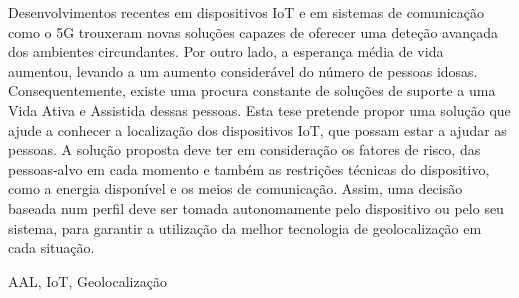 


Desenvolvimentos recentes em dispositivos IoT e em sistemas de comunicação como o 5G trouxeram novas soluções capazes de oferecer uma deteção avançada dos ambientes circundantes. Por outro lado, a esperança média de vida aumentou, levando a um aumento considerável do número de pessoas idosas. Consequentemente, existe uma procura constante de soluções de suporte a uma Vida Ativa e Assistida  dessas pessoas. Esta tese pretende propor uma solução que ajude a conhecer a localização dos dispositivos IoT, que possam estar a ajudar as pessoas. A solução proposta deve ter em consideração os fatores de risco, das pessoas-alvo em cada momento e também as restrições técnicas do dispositivo, como a energia disponível e os meios de comunicação. Assim, uma decisão baseada num perfil deve ser tomada autonomamente pelo dispositivo ou pelo seu sistema, para garantir a utilização da melhor tecnologia de geolocalização em cada situação.





\begin{keywords}
AAL, IoT, Geolocalização
\end{keywords}
